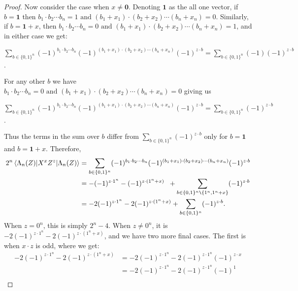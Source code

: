 \documentclass[12pt]{dalthesis}
\begin{document}
\begin{proof}
Now consider the case when $x \neq \textbf{0}$. Denoting $\textbf{1}$ as the all one vector, if $b = \textbf{1}$ then $b_1 \cdot b_2 \cdots b_n = 1 \mbox{ and } (b_1 + x_1) \cdot (b_2 + x_2) \cdots (b_n + x_n) = 0$. Similarly, if $b = \textbf{1} + x$, then $b_1 \cdot b_2 \cdots b_n = 0 \mbox{ and } (b_1 + x_1) \cdot (b_2 + x_2) \cdots (b_n + x_n) = 1$, and in either case we get: 
\begin{center}
$\sum\limits_{b \in \{0, 1\}^n} (-1)^{b_1 \cdot b_2 \cdots b_n} (-1)^{(b_1 + x_1) \cdot (b_2 + x_2) \cdots (b_n + x_n)} (-1)^{z \cdot b} = \sum\limits_{b \in \{0, 1\}^n} (-1) (-1)^{z \cdot b}$.
\end{center}
For any other $b$ we have $b_1 \cdot b_2 \cdots b_n = 0 \mbox{ and } (b_1 + x_1) \cdot (b_2 + x_2) \cdots (b_n + x_n) = 0$ giving us 
\begin{center}
$\sum\limits_{b \in \{0, 1\}^n} (-1)^{b_1 \cdot b_2 \cdots b_n} (-1)^{(b_1 + x_1) \cdot (b_2 + x_2) \cdots (b_n + x_n)} (-1)^{z \cdot b} = \sum\limits_{b \in \{0, 1\}^n} (-1)^{z \cdot b}$.
\end{center}
Thus the terms in the sum over $b$ differ from $\sum_{b \in \{0, 1\}^n} (-1)^{z \cdot b}$ only for $b = \textbf{1}$ and $b = \textbf{1} + x$. Therefore, 
\begin{equation*}
\begin{split}
2^n\braket{\Lambda_n (Z)|X^xZ^z|\Lambda_n (Z)} & = \sum\limits_{b \in \{0, 1\}^n} (-1)^{b_1 \cdot b_2 \cdots b_n} (-1)^{(b_1 + x_1) \cdot (b_2 + x_2) \cdots (b_n + x_n)} (-1)^{z \cdot b} \\
& = - (-1)^{z \cdot 1^n} - (-1)^{z \cdot (1^n + x)} \hspace{2mm} + \sum\limits_{b \in \{0, 1\}^n \texttt{\textbackslash} \{1^n, 1^n + x \} } (-1)^{z \cdot b}  \\
& = -2(-1)^{z \cdot 1^n} - 2(-1)^{z \cdot (1^n + x)} + \sum\limits_{b \in \{0, 1\}^n} (-1)^{z \cdot b}.
\end{split}
\end{equation*}
When $z = 0^n$, this is simply $2^n - 4$. When $z \neq 0^n$, it is $-2(-1)^{z \cdot 1^n} - 2(-1)^{z \cdot (1^n + x)}$, and we have two more final cases. The first is when $x \cdot z$ is odd, where we get:
\begin{equation*}
\begin{split}
-2(-1)^{z \cdot 1^n} - 2(-1)^{z \cdot (1^n + x)} & = -2(-1)^{z \cdot 1^n} - 2(-1)^{z \cdot 1^n} (-1)^{z \cdot x} \\
& = -2(-1)^{z \cdot 1^n} - 2(-1)^{z \cdot 1^n} (-1)^1 \\

\end{split}
\end{equation*}
\end{proof}
\end{document}
